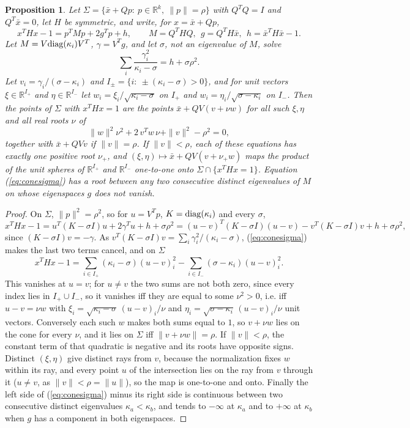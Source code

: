 \documentclass[11pt]{article}
\newtheorem{prop}[thm]{Proposition}
\theoremstyle{definition}
\theoremstyle{remark}
\newcommand{\R}{\mathbb{R}}
\begin{document}
\begin{prop}
\label{prop:cone}
Let $\Sigma=\{\bar x+Qp:\ p\in\R^k,\ \|p\|=\rho\}$ with $Q^TQ=I$ and
$Q^T\bar x=0$, let $H$ be symmetric, and write, for $x=\bar x+Qp$,
\[ x^THx-1=p^TMp+2g^Tp+h, \qquad M=Q^THQ,\ \ g=Q^TH\bar x,\ \
   h=\bar x^TH\bar x-1. \]
Let $M=V{\rm diag}(\kappa_i)V^T$, $\gamma=V^Tg$, and let $\sigma$, not an
eigenvalue of $M$, solve
\begin{equation}
\label{eq:conesigma}
\sum_i\frac{\gamma_i^2}{\kappa_i-\sigma}=h+\sigma\rho^2.
\end{equation}
Let $v_i=\gamma_i/(\sigma-\kappa_i)$ and $I_\pm=\{i:\ \pm(\kappa_i-\sigma)>0\}$,
and for unit vectors $\xi\in\R^{I_+}$ and $\eta\in\R^{I_-}$ let
$w_i=\xi_i/\sqrt{\kappa_i-\sigma}$ on $I_+$ and
$w_i=\eta_i/\sqrt{\sigma-\kappa_i}$ on $I_-$. Then the points of $\Sigma$ with
$x^THx=1$ are the points $\bar x+QV(v+\nu w)$ for all such $\xi,\eta$ and all
real roots $\nu$ of
\[ \|w\|^2\nu^2+2\,v^Tw\,\nu+\|v\|^2-\rho^2=0, \]
together with $\bar x+QVv$ if $\|v\|=\rho$. If $\|v\|<\rho$, each of these
equations has exactly one positive root $\nu_+$, and
$(\xi,\eta)\mapsto\bar x+QV(v+\nu_+w)$ maps the product of the unit spheres
of $\R^{I_+}$ and $\R^{I_-}$ one-to-one onto $\Sigma\cap\{x^THx=1\}$.
Equation (\ref{eq:conesigma}) has a root between any two consecutive
distinct eigenvalues of $M$ on whose eigenspaces $g$ does not vanish.
\end{prop}
\begin{proof}
On $\Sigma$, $\|p\|^2=\rho^2$, so for $u=V^Tp$, $K={\rm diag}(\kappa_i)$ and
every $\sigma$,
\[ x^THx-1=u^T(K-\sigma I)u+2\gamma^Tu+h+\sigma\rho^2
   =(u-v)^T(K-\sigma I)(u-v)-v^T(K-\sigma I)v+h+\sigma\rho^2, \]
since $(K-\sigma I)v=-\gamma$. As
$v^T(K-\sigma I)v=\sum_i\gamma_i^2/(\kappa_i-\sigma)$, (\ref{eq:conesigma})
makes the last two terms cancel, and on $\Sigma$
\[ x^THx-1=\sum_{i\in I_+}(\kappa_i-\sigma)(u-v)_i^2
   -\sum_{i\in I_-}(\sigma-\kappa_i)(u-v)_i^2. \]
This vanishes at $u=v$; for $u\neq v$ the two sums are not both zero, since
every index lies in $I_+\cup I_-$, so it vanishes iff they are equal to some
$\nu^2>0$, i.e. iff $u-v=\nu w$ with
$\xi_i=\sqrt{\kappa_i-\sigma}\,(u-v)_i/\nu$ and
$\eta_i=\sqrt{\sigma-\kappa_i}\,(u-v)_i/\nu$ unit vectors. Conversely each
such $w$ makes both sums equal to $1$, so $v+\nu w$ lies on the cone for
every $\nu$, and it lies on $\Sigma$ iff $\|v+\nu w\|=\rho$. If $\|v\|<\rho$,
the constant term of that quadratic is negative and its roots have opposite
signs. Distinct $(\xi,\eta)$ give distinct rays from $v$, because the
normalization fixes $w$ within its ray, and every point $u$ of the
intersection lies on the ray from $v$ through it ($u\neq v$, as
$\|v\|<\rho=\|u\|$), so the map is one-to-one and onto. Finally the left
side of (\ref{eq:conesigma}) minus its right side is continuous between two
consecutive distinct eigenvalues $\kappa_a<\kappa_b$, and tends to
$-\infty$ at $\kappa_a$ and to $+\infty$ at $\kappa_b$ when $g$ has a
component in both eigenspaces.
\end{proof}
\end{document}
